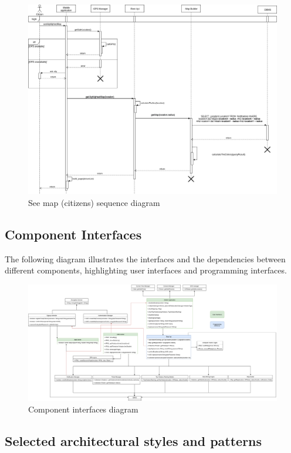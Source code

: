 \documentclass{article}
\begin{document}
	\begin{figure}[h]
	\includegraphics[width=\linewidth]{images/See_Highlighted_Map_Sequence_Diagram.png}
		\caption{See map (citizens) sequence diagram}
	\end{figure}
	\newpage \FloatBarrier
	\subsection{Component Interfaces}
	The following diagram illustrates the interfaces and the dependencies between different components, highlighting user interfaces and programming interfaces.
		\begin{figure}[H]
			\includegraphics[width=\linewidth]{images/Interface_diagram.png}
			\caption{Component interfaces diagram}
		\end{figure}
	\subsection{Selected architectural styles and patterns} \label{sec:Patterns}
\end{document}

